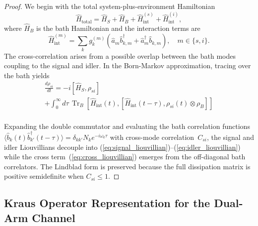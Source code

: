 \documentclass[journal]{IEEEtran}
\DeclareMathOperator{\Tr}{Tr}
\begin{document}
\begin{proof}
We begin with the total system-plus-environment Hamiltonian
\begin{equation}
\hat{H}_{\text{total}} = \hat{H}_S + \hat{H}_B + \hat{H}_{\text{int}}^{(s)} + \hat{H}_{\text{int}}^{(i)},
\end{equation}
where $\hat{H}_B$ is the bath Hamiltonian and the interaction terms are
\begin{equation}
\hat{H}_{\text{int}}^{(m)} = \sum_k g_k^{(m)}(\hat{a}_m \hat{b}_{k,m}^\dagger + \hat{a}_m^\dagger \hat{b}_{k,m}), \quad m \in \{s, i\}.
\end{equation}
The cross-correlation arises from a possible overlap between the bath modes coupling to the signal and idler. In the Born-Markov approximation, tracing over the bath yields
\begin{equation}
\begin{gathered}
     \frac{d\rho_{si}}{dt} = - i[\hat{H}_S, \rho_{si}]\\  + \int_0^{\infty}\! d\tau \, \Tr_B\left[\hat{H}_{\text{int}}(t), [\hat{H}_{\text{int}}(t-\tau), \rho_{si}(t)\otimes\rho_B]\right]\\ 
\end{gathered}
\end{equation}

Expanding the double commutator and evaluating the bath correlation functions $\langle\hat{b}_k(t)\hat{b}_{k'}^\dagger(t-\tau)\rangle = \delta_{kk'}N_k e^{-i\omega_k\tau}$ with cross-mode correlation~$C_{si}$, the signal and idler Liouvillians decouple into (\ref{eq:signal_liouvillian})--(\ref{eq:idler_liouvillian}) while the cross term~(\ref{eq:cross_liouvillian}) emerges from the off-diagonal bath correlators. The Lindblad form is preserved because the full dissipation matrix is positive semidefinite when $C_{si} \leq 1$.
\end{proof}

\subsection{Kraus Operator Representation for the Dual-Arm Channel}
\end{document}
